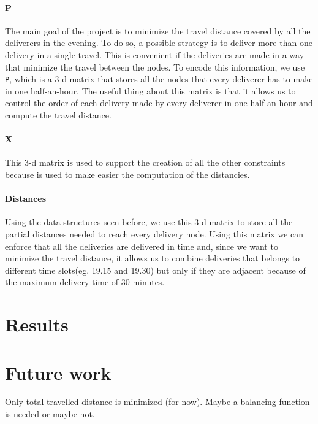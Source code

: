 \documentclass[10pt]{article}
\begin{document}
	\paragraph*{P} The main goal of the project is to minimize the travel distance 
	covered by all the deliverers in the evening. To do so, a possible strategy
	is to deliver more than one delivery in a single travel. This is convenient 
	if the deliveries are made in a way that minimize the travel between the nodes.
	To encode this information, we use \texttt{P}, which is a 3-d matrix that stores
	all the nodes that every deliverer has to make in one half-an-hour. The useful thing
	about this matrix is that it allows us to control the order of each delivery made 
	by every deliverer in one half-an-hour and compute the travel distance.
	
	\paragraph*{X} This 3-d matrix is used to support the creation of all the other 
	constraints because is used to make easier the computation of the distancies.

	\paragraph*{Distances}
	Using the data structures seen before, we use this 3-d matrix to store all
	the partial distances needed to reach every delivery node. Using this matrix we can 
	enforce that all the deliveries are delivered in time and, since we want to minimize 
	the travel distance, it allows us to combine deliveries that belongs to different
	time slots(eg. 19.15 and 19.30) but only if they are adjacent because of the maximum 
	delivery time of 30 minutes.

	\paragraph*{}


	

	\section{Results}
	\label{Results}

	\section{Future work}
	\label{Future work}
	Only total travelled distance is minimized (for now). Maybe a balancing 
	function is needed or maybe not.
\end{document}
